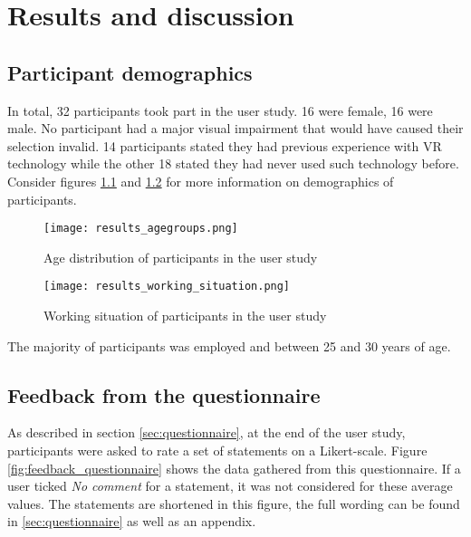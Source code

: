 \chapter{Results and discussion}
\label{sec:results_and_discussion}

	\section{Participant demographics}
	\label{sec:participant_demographics}

In total, 32 participants took part in the user study. 16 were female, 16 were male. No participant had a major visual impairment that would have caused their selection invalid. 14 participants stated they had previous experience with VR technology while the other 18 stated they had never used such technology before. Consider figures \ref{fig:results_agegroups} and \ref{fig:results_working_situation} for more information on demographics of participants.

\begin{figure}[h]
	\centering
	\texttt{[image: results\_agegroups.png]}\\ %
	\caption{Age distribution of participants in the user study}
	\label{fig:results_agegroups}
\end{figure}

\begin{figure}[h]
	\centering
	\texttt{[image: results\_working\_situation.png]}\\ %
	\caption{Working situation of participants in the user study}
	\label{fig:results_working_situation}
\end{figure}

The majority of participants was employed and between 25 and 30 years of age.

	\section{Feedback from the questionnaire}
	\label{sec:results_feedback_from_questionnaire}

As described in section \ref{sec:questionnaire}, at the end of the user study, participants were asked to rate a set of statements on a Likert-scale. Figure \ref{fig:feedback_questionnaire} shows the data gathered from this questionnaire. If a user ticked \textit{No comment} for a statement, it was not considered for these average values. The statements are shortened in this figure, the full wording can be found in \ref{sec:questionnaire} as well as an appendix.

